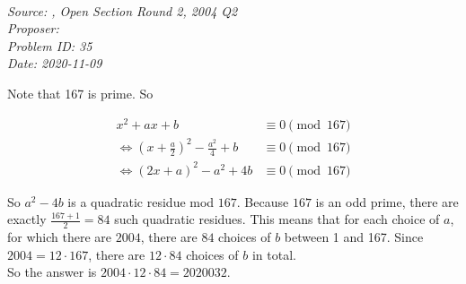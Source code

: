 \SSbreak\\
\emph{Source: \Csmo, Open Section Round 2, 2004 Q2}\\
\emph{Proposer: \Pbrain}\\
\emph{Problem ID: 35}\\
\emph{Date: 2020-11-09}\\
\SSbreak

\bigskip

\begin{solution}\hfil\medskip 

    Note that 167 is prime. So 
    
    \begin{align*}
        x^2 + ax + b &\equiv 0 \pmod{167} \\
        \iff (x + \frac a2)^2 - \frac{a^2}{4} + b &\equiv 0 \pmod{167}\\
        \iff (2x + a)^2 - a^2 + 4b &\equiv 0 \pmod{167}
    \end{align*}

    So $a^2 - 4b$ is a quadratic residue mod $167$. 
    Because $167$ is an odd prime, there are exactly $\frac{167+1}{2}=84$ such quadratic residues. 
    This means that for each choice of $a$, for which there are $2004$, there are $84$ choices of $b$ between 1 and 167. 
    Since $2004 = 12 \cdot 167$, there are $12 \cdot 84$ choices of $b$ in total. \\
    So the answer is $2004 \cdot 12 \cdot 84 = \boxed{2020032}$. 
\end{solution}\bigskip
